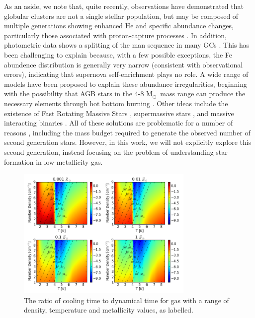 \documentclass[useAMS,usenatbib]{mn2e}
\newcommand{\msun}{{M$_\odot$}}
\begin{document}
As an aside, we note that, quite recently, observations have demonstrated that globular clusters are not a single stellar population, but may be composed of multiple generations showing enhanced He and specific abundance changes, particularly those associated with proton-capture processes \citep[e.g.,][]{Norris1981, Kraft1994, Gratton2001, Carretta2009}.  In addition, photometric data shows a splitting of the man sequence in many GCs \citet[e.g.,][]{Piotto2009, Anderson2009, Milone2010}.  This has been challenging to explain because, with a few possible exceptions, the Fe abundence distribution is generally very narrow (consistent with observational errors), indicating that supernova self-enrichment plays no role.  A wide range of models have been proposed to explain these abundance irregularities, beginning with the possibility that AGB stars in the 4-8 \msun\ mass range can produce the necessary elements through hot bottom burning \citep[e.g.,][]{DErcole2010, Ventura2013}.  Other ideas include the existence of Fast Rotating Massive Stars \citep[FRMS][]{Krause2013}, supermassive stars \citep{Denissenkov2014,  Denissenkov2015}, and massive interacting binaries \citet[e.g.,][]{deMink2009, Bastian2013}.  All of these solutions are problematic for a number of reasons \citep[e.g.,][]{Renzini2015, Bastian2015}, including the mass budget required to generate the observed number of second generation stars.  However, in this work, we will not explicitly explore this second generation, instead focusing on the problem of understanding star formation in low-metallicity gas.

\begin{figure}
\begin{center}
\mbox{\includegraphics[width=8.5cm]{Images/cooling_to_freefall_no_background}}
\end{center}
\caption{\label{fig:cooling_to_freefall} The ratio of cooling time to dynamical time for gas with a range of density, temperature and metallicity values, as labelled.}
\end{figure}
\end{document}
